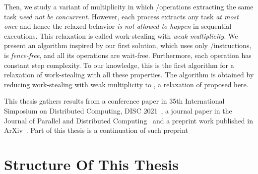 Then, we study a variant of multiplicity in which \Take/\Steal operations extracting the same task \emph{need not be concurrent}. However, each process extracts any task \emph{at most once} and hence the relaxed behavior \emph{is not allowed to happen} in sequential executions.  This relaxation is called work-stealing with \emph{weak multiplicity}. We present an algorithm inspired by our first solution, which uses only \R/\W instructions, is \emph{fence-free}, and all its operations are wait-free. Furthermore, each operation has constant step complexity. To our knowledge, this is the first algorithm for a relaxation of work-stealing with all these properties. The algorithm is obtained by reducing work-stealing with weak multiplicity to \RangeMaxReg, a relaxation of \MaxReg proposed here.





This thesis gathers results from a conference paper in 35th International Simposium on Distributed Computing, DISC 2021~\cite{DBLP_conf_wdag_CastanedaP21}, a journal paper in the Journal of Parallel and Distributed Computing~\cite{DBLP_journals_jpdc_CastanedaP24} and a preprint work published in ArXiv~\cite{arxiv_2205_06323}. Part of this thesis is a continuation of such preprint
\section{\label{section:Organization}Structure Of This Thesis}
